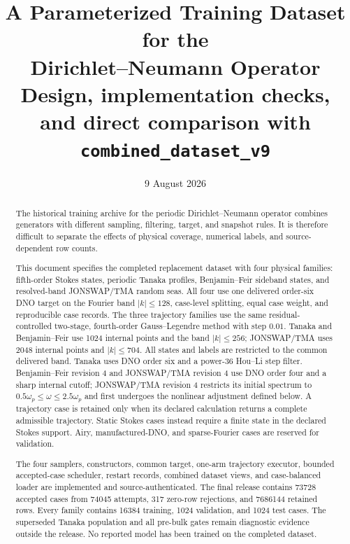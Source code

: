 \documentclass[11pt]{article}
\title{A Parameterized Training Dataset for the\\
Dirichlet--Neumann Operator\\[0.4em]
\large Design, implementation checks, and direct comparison with
\texttt{combined\_dataset\_v9}}
\author{}
\date{9 August 2026}
\begin{document}
\maketitle

\begin{abstract}
The historical training archive for the periodic Dirichlet--Neumann operator
combines generators with different sampling, filtering, target, and snapshot
rules.  It is therefore difficult to separate the effects of physical
coverage, numerical labels, and source-dependent row counts.

This document specifies the completed replacement dataset with four physical
families: fifth-order Stokes states, periodic Tanaka profiles,
Benjamin--Feir sideband states, and resolved-band JONSWAP/TMA random seas.
All four use one delivered order-six DNO target on the Fourier band
$|k|\leq128$, case-level splitting, equal case weight, and reproducible case
records.  The three trajectory families use the same residual-controlled
	two-stage, fourth-order Gauss--Legendre method with step \(0.01\).  Tanaka
	and Benjamin--Feir use 1024 internal points and the band $|k|\leq256$;
	JONSWAP/TMA uses 2048 internal points and $|k|\leq704$.  All states and
	labels are restricted to the common delivered band.  Tanaka uses DNO order
	six and a power-36 Hou--Li step filter.  Benjamin--Feir revision 4 and
	JONSWAP/TMA revision 4 use DNO order four and a sharp internal cutoff;
	JONSWAP/TMA revision 4 restricts its initial spectrum to
	$0.5\omega_p\leq\omega\leq2.5\omega_p$ and first undergoes the nonlinear
	adjustment defined below.  A trajectory case is
retained only when its declared calculation returns a complete admissible
trajectory.  Static Stokes cases instead require a finite state in the
declared Stokes support.  Airy, manufactured-DNO, and sparse-Fourier cases
are reserved for validation.

The four samplers, constructors, common target, one-arm trajectory executor,
bounded accepted-case scheduler, restart records, combined dataset views, and
case-balanced loader are implemented and source-authenticated.  The final
release contains 73728 accepted cases from 74045 attempts, 317 zero-row
rejections, and 7686144 retained rows.  Every family contains 16384 training,
1024 validation, and 1024 test cases.  The superseded Tanaka population and
all pre-bulk gates remain diagnostic evidence outside the release.  No
reported model has been trained on the completed dataset.
\end{abstract}
\end{document}
